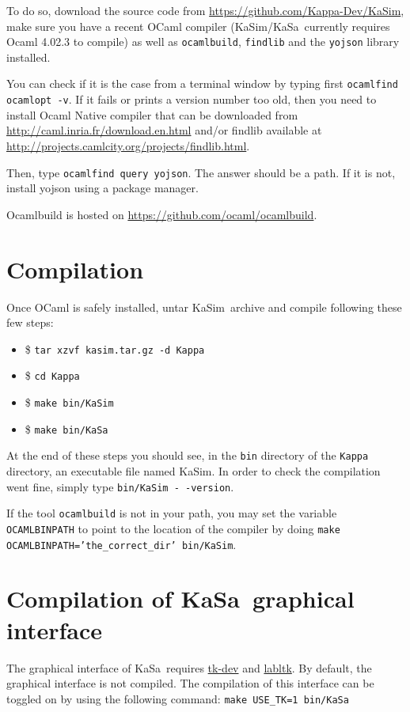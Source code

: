 \documentclass[11pt]{book}
\def\KaSim{\textsf{KaSim}}
\def\KaSa{\textsf{KaSa}}
\def\ttt#1{\texttt{#1}}
\def\ITE#1{\begin{itemize}#1\end{itemize}}
\begin{document}
To do so, download the source code from
\url{https://github.com/Kappa-Dev/KaSim}, make sure you have a recent
OCaml compiler (\KaSim/\KaSa~currently requires Ocaml 4.02.3 to
compile) as well as \ttt{ocamlbuild}, \ttt{findlib} and the
\ttt{yojson} library installed.

You can check if it is the case from a terminal window by typing
first \ttt{ocamlfind ocamlopt -v}. If it fails or prints a version number
too old, then you need to install Ocaml Native compiler that can be
downloaded from \url{http://caml.inria.fr/download.en.html} and/or
findlib available at
\url{http://projects.camlcity.org/projects/findlib.html}.

Then, type \ttt{ocamlfind query yojson}. The answer should be a
path. If it is not, install yojson using a package manager.

Ocamlbuild is hosted on \url{https://github.com/ocaml/ocamlbuild}.

\section{Compilation}
Once OCaml is safely installed, untar \KaSim~archive and compile following these
few steps: \ITE{
\item[\$]\ttt{tar xzvf kasim.tar.gz -d Kappa}
\item[\$]\ttt{cd Kappa}
\item[\$]\ttt{make bin/KaSim}
\item[\$]\ttt{make bin/KaSa}}

At the end of these steps you should see, in the
\ttt{bin} directory of the \ttt{Kappa} directory, an executable file named
KaSim.  In order to check the compilation went fine, simply type
\ttt{bin/KaSim -\,-version}.

If the tool \ttt{ocamlbuild} is not in your path, you may
set the variable \ttt{OCAMLBINPATH} to point to the location of the
compiler by doing \ttt{make OCAMLBINPATH='the\_correct\_dir' bin/KaSim}.

\section{Compilation of KaSa~graphical interface}

The graphical interface of \KaSa~requires
\href{http://www.tcl.tk/}{tk-dev} and
\href{https://forge.ocamlcore.org/projects/labltk/}{labltk}. By
default, the graphical interface is not compiled. The compilation of
this interface can be toggled on by using the following command:
\ttt{make USE\_TK=1 bin/KaSa}
\end{document}
